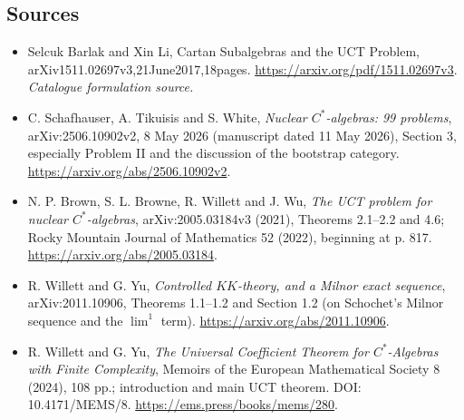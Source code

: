 \documentclass[11pt,a4paper]{article}
\begin{document}
\subsection{Sources}
\begin{itemize}\raggedright
\item[\textnormal{[S1]}]\hypertarget{source:203:1}{} Selcuk Barlak and Xin Li, Cartan Subalgebras and the UCT Problem, arXiv1511.02697v3,21June2017,18pages.
\url{https://arxiv.org/pdf/1511.02697v3}.
{\small\textit{Catalogue formulation source.}}
\item[\textnormal{[E1]}]\hypertarget{extra:203:1}{}
C. Schafhauser, A. Tikuisis and S. White,
\emph{Nuclear $C^*$-algebras: 99 problems}, arXiv:2506.10902v2,
8 May 2026 (manuscript dated 11 May 2026), Section 3, especially Problem II
and the discussion of the bootstrap category.
\url{https://arxiv.org/abs/2506.10902v2}.
\item[\textnormal{[E2]}]\hypertarget{extra:203:2}{}
N. P. Brown, S. L. Browne, R. Willett and J. Wu,
\emph{The UCT problem for nuclear $C^*$-algebras},
arXiv:2005.03184v3 (2021), Theorems 2.1--2.2 and 4.6;
Rocky Mountain Journal of Mathematics 52 (2022), beginning at p. 817.
\url{https://arxiv.org/abs/2005.03184}.
\item[\textnormal{[E3]}]\hypertarget{extra:203:3}{}
R. Willett and G. Yu, \emph{Controlled $KK$-theory, and a Milnor exact
sequence}, arXiv:2011.10906, Theorems 1.1--1.2 and Section 1.2
(on Schochet's Milnor sequence and the $\lim^1$ term).
\url{https://arxiv.org/abs/2011.10906}.
\item[\textnormal{[E4]}]\hypertarget{extra:203:4}{}
R. Willett and G. Yu, \emph{The Universal Coefficient Theorem for
$C^*$-Algebras with Finite Complexity}, Memoirs of the European
Mathematical Society 8 (2024), 108 pp.; introduction and main UCT theorem.
DOI: 10.4171/MEMS/8.
\url{https://ems.press/books/mems/280}.
\end{itemize}
\end{document}
